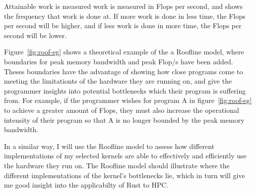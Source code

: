 Attainable work is measured work is measured in Flops per second, and shows the frequency that work is done at. If more work is done in less time, the Flops per second will be higher, and if less work is done in more time, the Flops per second will be lower.

Figure~\ref{fig:roof-eg} shows a theoretical example of the a Roofline model, where boundaries for peak memory bandwidth and peak Flop/s have been added. Theses boundaries have the advantage of showing how close programs come to meeting the limitationts of the hardware they are running on, and give the programmer insights into potential bottlenecks which their program is suffering from. 
For example, if the programmer wishes for program A in figure~\ref{fig:roof-eg} to achieve a greater amount of Flops, they must also increase the operational intensity of their program so that A is no longer bounded by the peak memory bandwidth.

In a similar way, I will use the Roofline model to assess how different implementations of my selected kernels are able to effectively and efficiently use the hardware they run on. The Roofline model should illustrate where the different implementations of the kernel's bottlenecks lie, which in turn will give me good insight into the applicabilty of Rust to HPC.
